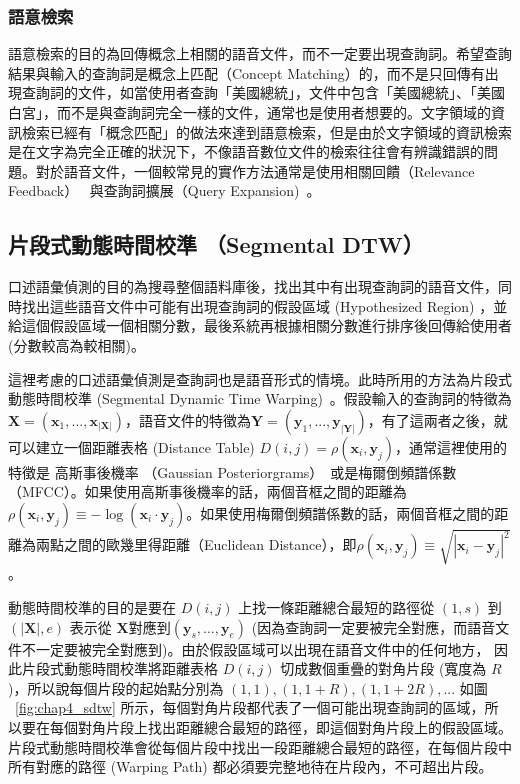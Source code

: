 \subsubsection{語意檢索}
語意檢索的目的為回傳概念上相關的語音文件，而不一定要出現查詢詞。希望查詢結果與輸入的查詢詞是概念上匹配（Concept
Matching）的，而不是只回傳有出現查詢詞的文件，如當使用者查詢「美國總統」，文件中包含「美國總統」、「美國白宮」，而不是與查詢詞完全一樣的文件，通常也是使用者想要的。文字領域的資訊檢索已經有「概念匹配」的做法來達到語意檢索，但是由於文字領域的資訊檢索是在文字為完全正確的狀況下，不像語音數位文件的檢索往往會有辨識錯誤的問題。對於語音文件，一個較常見的實作方法通常是使用相關回饋（Relevance Feedback）~\cite{ruthven2003survey} 與查詢詞擴展（Query Expansion)~\cite{voorhees1994query,xu1996query}。

\subsection{片段式動態時間校準 （Segmental DTW）}
\label{sec:chap4_sdtw}
口述語彙偵測的目的為搜尋整個語料庫後，找出其中有出現查詢詞的語音文件，同時找出這些語音文件中可能有出現查詢詞的假設區域 (Hypothesized Region) ，並給這個假設區域一個相關分數，最後系統再根據相關分數進行排序後回傳給使用者 (分數較高為較相關)。

這裡考慮的口述語彙偵測是查詢詞也是語音形式的情境。此時所用的方法為片段式動態時間校準 (Segmental Dynamic Time Warping)~\cite{chan2010unsupervised, hazen2009query}。假設輸入的查詢詞的特徵為$\mathbf{X} = (\mathbf{x}_1, ..., \mathbf{x}_{|\mathbf{X}|})$，語音文件的特徵為$\mathbf{Y} = (\mathbf{y}_1, ..., \mathbf{y}_{|\mathbf{Y}|})$，有了這兩者之後，就可以建立一個距離表格 (Distance Table) $D(i, j) = \rho(\mathbf{x}_i, \mathbf{y}_j)$，通常這裡使用的特徵是
高斯事後機率 （Gaussian Posteriorgrams）~\cite{zhang2009unsupervised}或是梅爾倒頻譜係數
（MFCC）。如果使用高斯事後機率的話，兩個音框之間的距離為
$\rho(\mathbf{x}_i, \mathbf{y}_j) \equiv -\log (\mathbf{x}_i
\cdot\mathbf{y}_j)$。如果使用梅爾倒頻譜係數的話，兩個音框之間的距離為兩點之間的歐幾里得距離（Euclidean
Distance），即$\rho(\mathbf{x}_i, \mathbf{y}_j)
\equiv\sqrt{|\mathbf{x}_i - \mathbf{y}_j|^2}$。

動態時間校準的目的是要在 $D(i, j)$ 上找一條距離總合最短的路徑從 $(1, s)$ 到 $(|\mathbf{X}|, e)$ 表示從 $\mathbf{X}$對應到$(\mathbf{y}_s, ..., \mathbf{y}_e)$ (因為查詢詞一定要被完全對應，而語音文件不一定要被完全對應到)。由於假設區域可以出現在語音文件中的任何地方， 因此片段式動態時間校準將距離表格 $D(i, j)$ 切成數個重疊的對角片段 (寬度為 $R$)，所以說每個片段的起始點分別為 $(1, 1), (1, 1+R), (1, 1+2R),...$ 如圖 ~\ref{fig:chap4_sdtw} 所示，每個對角片段都代表了一個可能出現查詢詞的區域，所以要在每個對角片段上找出距離總合最短的路徑，即這個對角片段上的假設區域。片段式動態時間校準會從每個片段中找出一段距離總合最短的路徑，在每個片段中所有對應的路徑 (Warping Path) 都必須要完整地待在片段內，不可超出片段。

